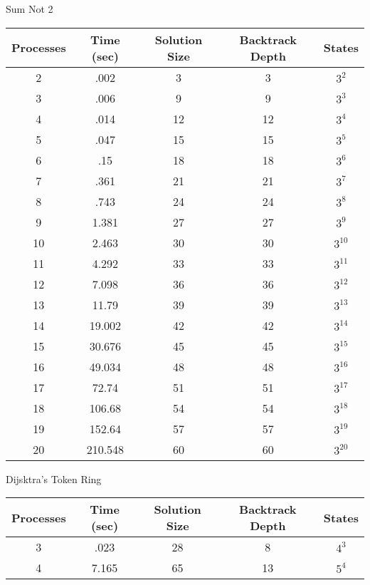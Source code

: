 \begin{center}
Sum Not 2 \\
\begin{tabular}{|c|c|c|c|c|}
\hline
 Processes & Time (sec) & Solution Size & Backtrack Depth & States \\
\hline
 2 & .002 & 3 & 3 & $3^{2}$               \\
 3 & .006 & 9 & 9 & $3^{3}$               \\
 4 & .014 & 12 & 12 & $3^{4}$             \\
 5 & .047 & 15 & 15 & $3^{5}$             \\
 6 & .15 & 18 & 18 & $3^{6}$              \\
 7 & .361 & 21 & 21 & $3^{7}$              \\
 8 & .743 & 24 & 24 & $3^{8}$             \\
 9 & 1.381 & 27 & 27 & $3^{9}$            \\
 10 & 2.463 & 30 & 30 & $3^{10}$          \\
 11 & 4.292 & 33 & 33 & $3^{11}$          \\
 12 & 7.098 & 36 & 36 & $3^{12}$          \\
 13 & 11.79 & 39 & 39 & $3^{13}$          \\
 14 & 19.002 & 42 & 42 & $3^{14}$         \\
 15 & 30.676 & 45 & 45 & $3^{15}$         \\
 16 & 49.034 & 48 & 48 & $3^{16}$         \\
 17 & 72.74 & 51 & 51 & $3^{17}$          \\
 18 & 106.68 & 54 & 54 & $3^{18}$          \\
 19 & 152.64 & 57 & 57 & $3^{19}$         \\
 20 & 210.548 & 60 & 60 & $3^{20}$        \\
\hline
\end{tabular}
\end{center}
 
\begin{center}
Dijsktra's Token Ring \\
\begin{tabular}{|c|c|c|c|c|}
\hline
 Processes & Time (sec) & Solution Size & Backtrack Depth & States \\
\hline
 3 & .023 & 28 & 8 & $4^{3}$         \\
 4 & 7.165 & 65 & 13 & $5^{4}$          \\
\hline
\end{tabular}
\end{center}

